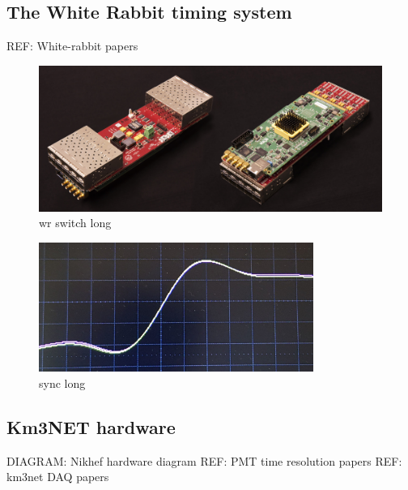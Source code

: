 \subsection{The White Rabbit timing system} %
\label{sec:daq_hard_timing} %

REF: White-rabbit papers

\begin{figure} %
    \includegraphics[width=\textwidth]{diagrams/5-daq/wr_switch.jpg}
    \caption[wr switch short]
    {wr switch long}
    \label{fig:wr_switch}
\end{figure}

\begin{figure} %
    \includegraphics[width=0.8\textwidth]{diagrams/5-daq/sync.jpg}
    \caption[sync short]
    {sync long}
    \label{fig:sync}
\end{figure}

\subsection{Km3NET hardware} %
\label{sec:daq_hard_km3net} %

DIAGRAM: Nikhef hardware diagram
REF: PMT time resolution papers
REF: km3net DAQ papers


